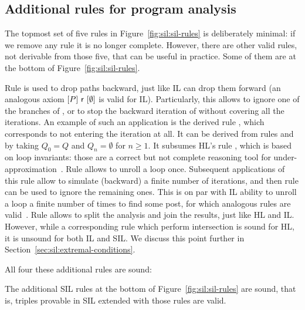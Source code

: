 \subsection{Additional rules for program analysis}\label{sec:sil:sil-rules-additional}
The topmost set of five rules in Figure~\ref{fig:sil:sil-rules} is deliberately minimal: if we remove any rule it is no longer complete. However, there are other valid rules, not derivable from those five, that can be useful in practice. Some of them are at the bottom of Figure~\ref{fig:sil:sil-rules}.

Rule  is used to drop paths backward, just like IL can drop them forward (an analogous axiom $[P]~\mathsf{r}~[\emptyset]$ is valid for IL). Particularly, this allows to ignore one of the branches of , or to stop the backward iteration of  without covering all the iterations. An example of such an application is the derived rule , which corresponds to not entering the iteration at all. It can be derived from rules  and  by taking $Q_0 = Q$ and $Q_n = \emptyset$ for $n \ge 1$. It subsumes HL's rule , which is based on loop invariants: those are a correct but not complete reasoning tool for under\hyp{}approximation~\cite{OHearn20}.
Rule  allows to unroll a loop once. Subsequent applications of this rule allow to simulate (backward) a finite number of iterations, and then rule  can be used to ignore the remaining ones. This is on par with IL ability to unroll a loop a finite number of times to find some post, for which analogous rules are valid~\cite{OHearn20,MOH21}.
Rule  allows to split the analysis and join the results, just like HL and IL. However, while a corresponding rule  which perform intersection is sound for HL, it is unsound for both IL and SIL. We discuss this point further in Section~\ref{sec:sil:extremal-conditions}.

All four these additional rules are sound:
\begin{prop}\label{prop:sil:sil-additional-soundness}
	The additional SIL rules at the bottom of Figure~\ref{fig:sil:sil-rules} are sound, that is, triples provable in SIL extended with those rules are valid.
\end{prop}

